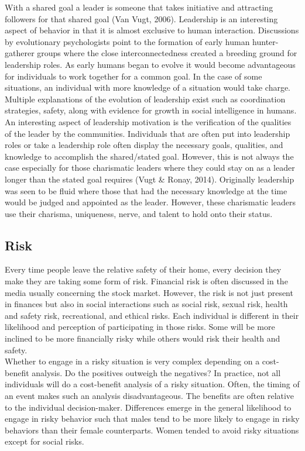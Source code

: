 \documentclass[
  english,
  ,doc, 12pt, a4paper,floatsintext]{apa7}
\begin{document}
With a shared goal a leader is someone that takes initiative and attracting followers for that shared goal (Van Vugt, 2006). Leadership is an interesting aspect of behavior in that it is almost exclusive to human interaction. Discussions by evolutionary psychologists point to the formation of early human hunter-gatherer groups where the close interconnectedness created a breeding ground for leadership roles. As early humans began to evolve it would become advantageous for individuals to work together for a common goal. In the case of some situations, an individual with more knowledge of a situation would take charge. Multiple explanations of the evolution of leadership exist such as coordination strategies, safety, along with evidence for growth in social intelligence in humans.\\
An interesting aspect of leadership motivation is the verification of the qualities of the leader by the communities. Individuals that are often put into leadership roles or take a leadership role often display the necessary goals, qualities, and knowledge to accomplish the shared/stated goal. However, this is not always the case especially for those charismatic leaders where they could stay on as a leader longer than the stated goal requires (Vugt \& Ronay, 2014). Originally leadership was seen to be fluid where those that had the necessary knowledge at the time would be judged and appointed as the leader. However, these charismatic leaders use their charisma, uniqueness, nerve, and talent to hold onto their status.

\hypertarget{risk}{%
\subsection{Risk}\label{risk}}

Every time people leave the relative safety of their home, every decision they make they are taking some form of risk. Financial risk is often discussed in the media usually concerning the stock market. However, the risk is not just present in finances but also in social interactions such as social risk, sexual risk, health and safety risk, recreational, and ethical risks. Each individual is different in their likelihood and perception of participating in those risks. Some will be more inclined to be more financially risky while others would risk their health and safety.\\
Whether to engage in a risky situation is very complex depending on a cost-benefit analysis. Do the positives outweigh the negatives? In practice, not all individuals will do a cost-benefit analysis of a risky situation. Often, the timing of an event makes such an analysis disadvantageous. The benefits are often relative to the individual decision-maker. Differences emerge in the general likelihood to engage in risky behavior such that males tend to be more likely to engage in risky behaviors than their female counterparts. Women tended to avoid risky situations except for social risks.
\end{document}
